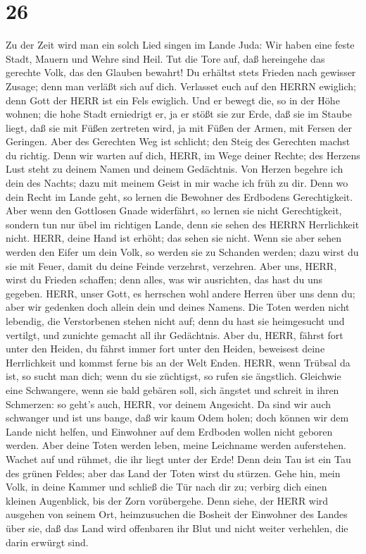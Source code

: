 \hypertarget{section-25}{%
\section{26}\label{section-25}}

 Zu der Zeit wird man ein solch Lied singen im Lande Juda:
Wir haben eine feste Stadt, Mauern und Wehre sind Heil.  Tut
die Tore auf, daß hereingehe das gerechte Volk, das den Glauben bewahrt!
 Du erhältst stets Frieden nach gewisser Zusage; denn man
verläßt sich auf dich.  Verlasset euch auf den HERRN
ewiglich; denn Gott der HERR ist ein Fels ewiglich.  Und er
bewegt die, so in der Höhe wohnen; die hohe Stadt erniedrigt er, ja er
stößt sie zur Erde, daß sie im Staube liegt,  daß sie mit
Füßen zertreten wird, ja mit Füßen der Armen, mit Fersen der Geringen.
 Aber des Gerechten Weg ist schlicht; den Steig des
Gerechten machst du richtig.  Denn wir warten auf dich,
HERR, im Wege deiner Rechte; des Herzens Lust steht zu deinem Namen und
deinem Gedächtnis.  Von Herzen begehre ich dein des Nachts;
dazu mit meinem Geist in mir wache ich früh zu dir. Denn wo dein Recht
im Lande geht, so lernen die Bewohner des Erdbodens Gerechtigkeit.
 Aber wenn den Gottlosen Gnade widerfährt, so lernen sie
nicht Gerechtigkeit, sondern tun nur übel im richtigen Lande, denn sie
sehen des HERRN Herrlichkeit nicht.  HERR, deine Hand ist
erhöht; das sehen sie nicht. Wenn sie aber sehen werden den Eifer um
dein Volk, so werden sie zu Schanden werden; dazu wirst du sie mit
Feuer, damit du deine Feinde verzehrst, verzehren.  Aber
uns, HERR, wirst du Frieden schaffen; denn alles, was wir ausrichten,
das hast du uns gegeben.  HERR, unser Gott, es herrschen
wohl andere Herren über uns denn du; aber wir gedenken doch allein dein
und deines Namens.  Die Toten werden nicht lebendig, die
Verstorbenen stehen nicht auf; denn du hast sie heimgesucht und
vertilgt, und zunichte gemacht all ihr Gedächtnis.  Aber
du, HERR, fährst fort unter den Heiden, du fährst immer fort unter den
Heiden, beweisest deine Herrlichkeit und kommst ferne bis an der Welt
Enden.  HERR, wenn Trübsal da ist, so sucht man dich; wenn
du sie züchtigst, so rufen sie ängstlich.  Gleichwie eine
Schwangere, wenn sie bald gebären soll, sich ängstet und schreit in
ihren Schmerzen: so geht's auch, HERR, vor deinem Angesicht.
 Da sind wir auch schwanger und ist uns bange, daß wir kaum
Odem holen; doch können wir dem Lande nicht helfen, und Einwohner auf
dem Erdboden wollen nicht geboren werden.  Aber deine Toten
werden leben, meine Leichname werden auferstehen. Wachet auf und rühmet,
die ihr liegt unter der Erde! Denn dein Tau ist ein Tau des grünen
Feldes; aber das Land der Toten wirst du stürzen.  Gehe
hin, mein Volk, in deine Kammer und schließ die Tür nach dir zu; verbirg
dich einen kleinen Augenblick, bis der Zorn vorübergehe. 
Denn siehe, der HERR wird ausgehen von seinem Ort, heimzusuchen die
Bosheit der Einwohner des Landes über sie, daß das Land wird offenbaren
ihr Blut und nicht weiter verhehlen, die darin erwürgt sind.

